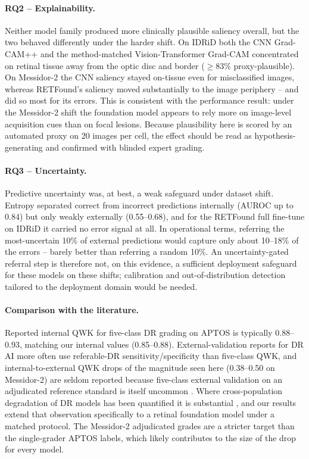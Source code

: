 \documentclass[11pt,a4paper]{article}
\begin{document}
\paragraph{RQ2 -- Explainability.} Neither model family produced more
clinically plausible saliency overall, but the two behaved differently under the
harder shift. On IDRiD both the CNN Grad-CAM++ and the method-matched
Vision-Transformer Grad-CAM concentrated on retinal tissue away from the optic
disc and border ($\geq$83\% proxy-plausible). On Messidor-2 the CNN saliency
stayed on-tissue even for misclassified images, whereas RETFound's saliency moved
substantially to the image periphery -- and did so most for its errors. This is
consistent with the performance result: under the Messidor-2 shift the foundation
model appears to rely more on image-level acquisition cues than on focal lesions.
Because plausibility here is scored by an automated proxy on 20 images per
cell, the effect should be read as hypothesis-generating and confirmed with
blinded expert grading.

\paragraph{RQ3 -- Uncertainty.} Predictive uncertainty was, at best, a weak
safeguard under dataset shift. Entropy separated correct from incorrect
predictions internally (AUROC up to 0.84) but only weakly externally (0.55--0.68),
and for the RETFound full fine-tune on IDRiD it carried no error signal at all.
In operational terms, referring the most-uncertain 10\% of external predictions
would capture only about 10--18\% of the errors -- barely better than referring a
random 10\%. An uncertainty-gated referral step is therefore not, on this
evidence, a sufficient deployment safeguard for these models on these shifts;
calibration and out-of-distribution detection tailored to the deployment domain
would be needed.

\paragraph{Comparison with the literature.} Reported internal QWK for five-class
DR grading on APTOS is typically 0.88--0.93, matching our internal values
(0.85--0.88). External-validation reports for DR AI more often use referable-DR
sensitivity/specificity than five-class QWK, and internal-to-external QWK drops
of the magnitude seen here (0.38--0.50 on Messidor-2) are seldom reported because
five-class external validation on an adjudicated reference standard is itself
uncommon \citep{grzybowski2020review}. Where cross-population degradation of DR
models has been quantified it is substantial \citep{dai2021spectrum,beede2020},
and our results extend that observation specifically to a retinal foundation
model under a matched protocol. The Messidor-2 adjudicated grades
\citep{krause2018} are a stricter target than the single-grader APTOS labels,
which likely contributes to the size of the drop for every model.
\end{document}
